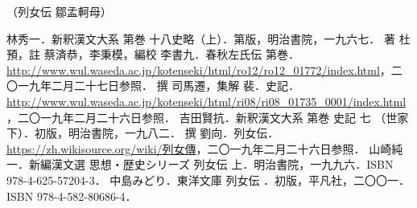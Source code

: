 \documentclass[a4j,landscape,twocolumn]{tarticle}
\begin{document}

\begin{flushright}{（列女伝 鄒孟軻母\cite{retsujoden}）}\end{flushright}

\vfill{}
\begin{thebibliography}{9}
	林秀一．新釈漢文大系 第巻 十八史略（上）．第版，明治書院，一九六七．
	著 杜預，註 蔡済恭，李秉模，編校 李書九．春秋左氏伝 第巻．\url{http://www.wul.waseda.ac.jp/kotenseki/html/ro12/ro12_01772/index.html}，二〇一九年二月二十七日参照．
	撰 司馬遷，集解 裴．史記．\url{http://www.wul.waseda.ac.jp/kotenseki/html/ri08/ri08_01735_0001/index.html}，二〇一九年二月二十六日参照．
	吉田賢抗．新釈漢文大系 第巻 史記 七 （世家下）．初版，明治書院，一九八二．
	 撰 劉向．列女伝．\url{https://zh.wikisource.org/wiki/列女傳}，二〇一九年二月二十六日参照．
	山崎純一．新編漢文選 思想・歴史シリーズ 列女伝 上．明治書院，一九九六．ISBN 978-4-625-57204-3．
	中島みどり．東洋文庫 列女伝 ．初版，平凡社，二〇〇一．ISBN 978-4-582-80686-4．
\end{thebibliography}
\end{document}
